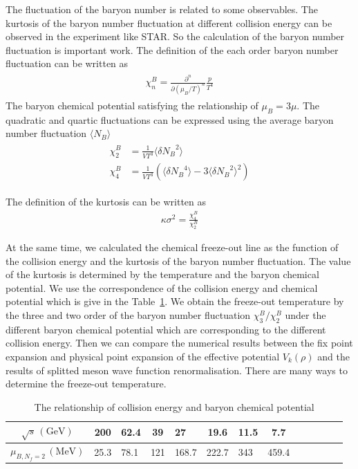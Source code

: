 \documentclass[%
reprint,
superscriptaddress,
showpacs,preprintnumbers,
 amsmath,amssymb,
 aps,
prd,
]{revtex4-1}
\begin{document}
The fluctuation of the baryon number is related to some observables. The kurtosis of the baryon number fluctuation at different collision energy 
can be observed in the experiment like STAR. So the calculation of the baryon number fluctuation is important work. 
The definition of the each order baryon number fluctuation can be written as
\begin{align}\label{}
\begin{split}
\chi^{B}_{n}=\frac{\partial^n}{\partial(\mu_B/T)^n}\frac{p}{T^4}
\end{split}
\end{align} 
The baryon chemical potential satisfying the relationship of $\mu_B=3\mu$. The quadratic and quartic fluctuations can be expressed using the 
average baryon number fluctuation $\langle N_B \rangle$
\begin{align}\label{}
\begin{split}
\chi^{B}_{2}&=\frac{1}{VT^3}\langle \delta {N_B}^2 \rangle\\
\chi^{B}_{4}&=\frac{1}{VT^3}\left( \langle \delta {N_B}^4 \rangle-3\langle \delta {N_B}^2 \rangle^2 \right)
\end{split}
\end{align}

The definition of the kurtosis can be written as
\begin{align}
\kappa \sigma^2=\frac{\chi^{B}_{4}}{\chi^{B}_{2}}
\end{align}\par
At the same time, we calculated the chemical freeze-out line as the function of the collision energy and the kurtosis of the baryon
number fluctuation. The value of the kurtosis is determined by the temperature and the baryon chemical potential. We use the 
correspondence of the collision energy and chemical potential which is give in the Table~\ref{tab:cle}. We obtain the freeze-out 
temperature by the three and two order of the baryon number fluctuation $\chi^B_3/\chi^B_2$ under the different baryon chemical 
potential which are corresponding to the different collision energy. Then we can compare the numerical results between the fix point 
expansion and physical point expansion of the effective potential $V_k(\rho)$ and the results of splitted meson wave function 
renormalisation. There are many ways to determine the freeze-out temperature. 
\begin{table}[h]
  \centering
  \begin{tabular}[c]{c|clclclclclcl}
    \hline \hline
    $\sqrt{s}\,(\mathrm{GeV})$ & 200 & 62.4 & 39 & 27 & 19.6 & 11.5 & 7.7\\ \hline
    $\mu_{B,N_f=2}\,(\mathrm{MeV})$&25.3&78.1&121&168.7&222.7&343&459.4\\ \hline
  \end{tabular}
  \caption{The relationship of collision energy and baryon chemical potential }
  \label{tab:cle}
\end{table}
\end{document}
